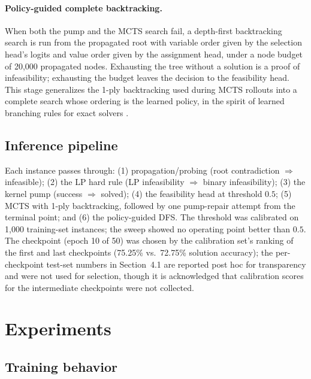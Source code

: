 \documentclass[12pt]{article}
\begin{document}
\paragraph{Policy-guided complete backtracking.} When both the pump and the MCTS search fail, a depth-first backtracking search is run from the propagated root with variable order given by the selection head's logits and value order given by the assignment head, under a node budget of 20{,}000 propagated nodes. Exhausting the tree without a solution is a proof of infeasibility; exhausting the budget leaves the decision to the feasibility head. This stage generalizes the 1-ply backtracking used during MCTS rollouts into a complete search whose ordering is the learned policy, in the spirit of learned branching rules for exact solvers \citep{gasse2019exact}.

\subsection{Inference pipeline}

Each instance passes through: (1) propagation/probing (root contradiction $\Rightarrow$ infeasible); (2) the LP hard rule (LP infeasibility $\Rightarrow$ binary infeasibility); (3) the kernel pump (success $\Rightarrow$ solved); (4) the feasibility head at threshold $0.5$; (5) MCTS with 1-ply backtracking, followed by one pump-repair attempt from the terminal point; and (6) the policy-guided DFS. The threshold was calibrated on 1{,}000 training-set instances; the sweep showed no operating point better than $0.5$. The checkpoint (epoch 10 of 50) was chosen by the calibration set's ranking of the first and last checkpoints (75.25\% vs.\ 72.75\% solution accuracy); the per-checkpoint test-set numbers in Section~4.1 are reported post hoc for transparency and were not used for selection, though it is acknowledged that calibration scores for the intermediate checkpoints were not collected.

\section{Experiments}

\subsection{Training behavior}
\end{document}
